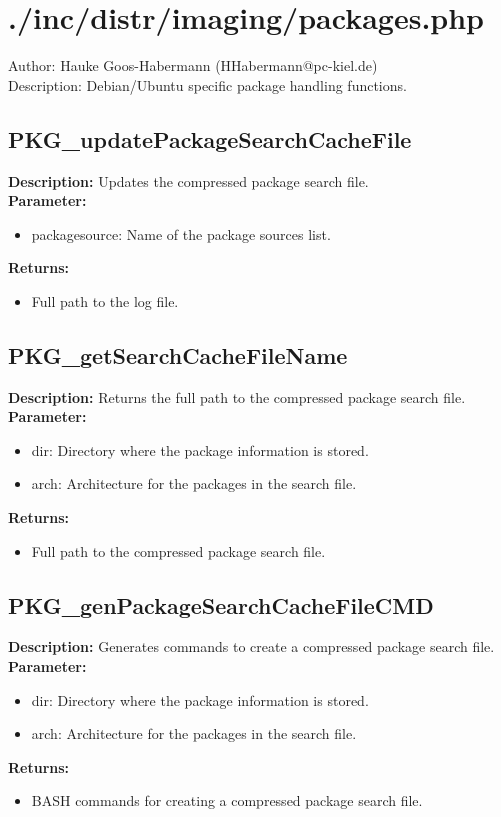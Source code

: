 \newpage\section{./inc/distr/imaging/packages.php}
 Author: Hauke Goos-Habermann (HHabermann@pc-kiel.de)\\
 Description: Debian/Ubuntu specific package handling functions.\\

\subsection{PKG\_updatePackageSearchCacheFile}
\textbf{Description:} Updates the compressed package search file.\\
\textbf{Parameter:}
\begin{itemize}
\item packagesource: Name of the package sources list.
\end{itemize}
\textbf{Returns:}
\begin{itemize}
\item Full path to the log file.
\end{itemize}

\subsection{PKG\_getSearchCacheFileName}
\textbf{Description:} Returns the full path to the compressed package search file.\\
\textbf{Parameter:}
\begin{itemize}
\item dir: Directory where the package information is stored.
\item arch: Architecture for the packages in the search file.
\end{itemize}
\textbf{Returns:}
\begin{itemize}
\item Full path to the compressed package search file.
\end{itemize}

\subsection{PKG\_genPackageSearchCacheFileCMD}
\textbf{Description:} Generates commands to create a compressed package search file.\\
\textbf{Parameter:}
\begin{itemize}
\item dir: Directory where the package information is stored.
\item arch: Architecture for the packages in the search file.
\end{itemize}
\textbf{Returns:}
\begin{itemize}
\item BASH commands for creating a compressed package search file.
\end{itemize}

